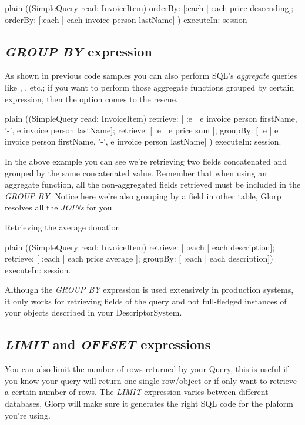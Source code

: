 \documentclass[10pt,twoside,english]{_support/latex/sbabook/sbabook}
\begin{document}
\begin{displaycode}{plain}
((SimpleQuery read: InvoiceItem)
	orderBy: [:each | each price descending];
	orderBy: [:each | each invoice person lastName]
	) executeIn: session
\end{displaycode}
\subsection{\textit{GROUP BY} expression}
As shown in previous code samples you can also perform SQL's \textit{aggregate}
queries like , , etc.; if you want to perform those
aggregate functions grouped by certain expression, then the 
option comes to the rescue.

\begin{displaycode}{plain}
((SimpleQuery read: InvoiceItem)
	retrieve: [ :e |
	 	e invoice person firstName, '-', e invoice person lastName];
	retrieve: [ :e | e price sum ];
	groupBy: [ :e |
		e invoice person firstName, '-', e invoice person lastName]
	) executeIn: session.
\end{displaycode}

In the above example you can see we're retrieving two fields concatenated
and grouped by the same concatenated value. Remember that when using
an aggregate function, all the non-aggregated fields retrieved must be included
in the \textit{GROUP BY}. Notice here we're also grouping by a field in other table,
Glorp resolves all the \textit{JOINs} for you.

Retrieving the average donation

\begin{displaycode}{plain}
((SimpleQuery read: InvoiceItem)
	retrieve: [ :each | each description];
	retrieve: [ :each | each price average ];
	groupBy: [ :each | each description]) executeIn: session.
\end{displaycode}

Although the \textit{GROUP BY} expression is used extensively in production systems,
it only works for retrieving fields of the query and not full-fledged instances
of your objects described in your DescriptorSystem.
\subsection{\textit{LIMIT} and \textit{OFFSET} expressions}
You can also limit the number of rows returned by your Query, this is useful
if you know your query will return one single row/object or if only want to
retrieve a certain number of rows. The \textit{LIMIT} expression varies between
different databases, Glorp will make sure it generates the right SQL code
for the plaform you're using.
\end{document}
